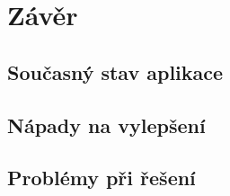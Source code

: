 \chapter{Závěr}

\section{Současný stav aplikace}

\section{Nápady na vylepšení}

\section{Problémy při řešení}
